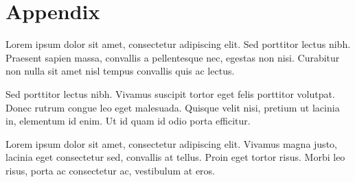 \documentclass[12pt,twocolumn]{article}
\begin{document}
\twocolumn
\section{Appendix}

Lorem ipsum dolor sit amet, consectetur adipiscing elit. Sed porttitor lectus nibh. Praesent sapien massa, convallis a pellentesque nec, egestas non nisi. Curabitur non nulla sit amet nisl tempus convallis quis ac lectus.

Sed porttitor lectus nibh. Vivamus suscipit tortor eget felis porttitor volutpat. Donec rutrum congue leo eget malesuada. Quisque velit nisi, pretium ut lacinia in, elementum id enim. Ut id quam id odio porta efficitur.

Lorem ipsum dolor sit amet, consectetur adipiscing elit. Vivamus magna justo, lacinia eget consectetur sed, convallis at tellus. Proin eget tortor risus. Morbi leo risus, porta ac consectetur ac, vestibulum at eros.
\end{document}
